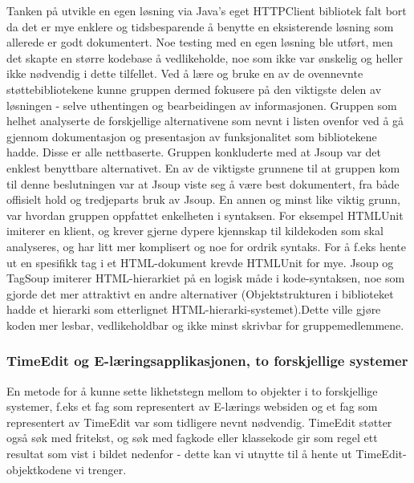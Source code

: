 \documentclass[../main.tex]{subfiles}
\begin{document}
Tanken på utvikle en egen løsning via Java’s eget HTTPClient bibliotek falt bort da det er mye enklere og tidsbesparende å benytte en eksisterende løsning som allerede er godt dokumentert. Noe testing med en egen løsning ble utført, men det skapte en større kodebase å vedlikeholde, noe som ikke var ønskelig og heller ikke nødvendig i dette tilfellet. Ved å lære og bruke en av de ovennevnte støttebibliotekene kunne gruppen dermed fokusere på den viktigste delen av løsningen - selve uthentingen og bearbeidingen av informasjonen.\newline
\newline
Gruppen som helhet analyserte de forskjellige alternativene som nevnt i listen ovenfor ved å gå gjennom dokumentasjon og presentasjon av funksjonalitet som bibliotekene hadde. Disse er alle nettbaserte.
Gruppen konkluderte med at Jsoup var det enklest benyttbare alternativet. En av de viktigste grunnene til at gruppen kom til denne beslutningen var at Jsoup viste seg å være best dokumentert, fra både offisielt hold og tredjeparts bruk av Jsoup. 
En annen og minst like viktig grunn, var hvordan gruppen oppfattet enkelheten i syntaksen. For eksempel HTMLUnit imiterer en klient, og krever gjerne dypere kjennskap til kildekoden som skal analyseres, og har litt mer komplisert og noe for ordrik syntaks. For å f.eks hente ut en spesifikk tag i et HTML-dokument krevde HTMLUnit for mye.
Jsoup og TagSoup imiterer HTML-hierarkiet på en logisk måde i kode-syntaksen, noe som gjorde det mer attraktivt en andre alternativer (Objektstrukturen i biblioteket hadde et hierarki som etterlignet HTML-hierarki-systemet).Dette ville gjøre koden mer lesbar, vedlikeholdbar og ikke minst skrivbar for gruppemedlemmene. 

\subsubsection{TimeEdit og E-læringsapplikasjonen, to forskjellige systemer}

En metode for å kunne sette likhetstegn mellom to objekter i to forskjellige systemer, f.eks et fag som representert av E-lærings websiden og et fag som representert av TimeEdit var som tidligere nevnt nødvendig.\newline
\newline
TimeEdit støtter også søk med fritekst, og søk med fagkode eller klassekode gir som regel ett resultat som vist i bildet nedenfor - dette kan vi utnytte til å hente ut TimeEdit-objektkodene vi trenger.
\end{document}
